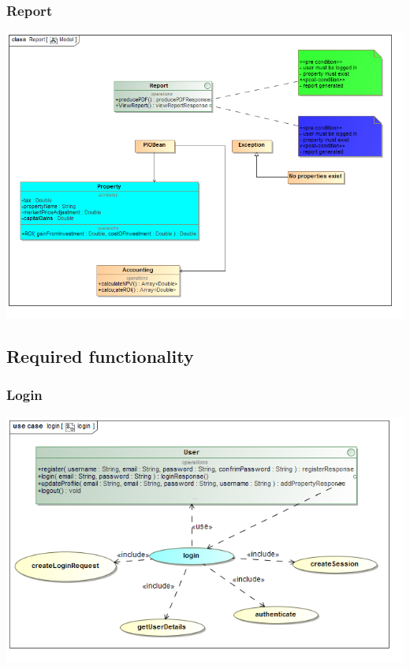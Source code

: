 \documentclass[a4paper,12pt]{article}
\begin{document}
\subsubsection{Report}
\includegraphics[width=1\textwidth]{./Images/newDiagrams/serviceContract/ReportServiceContract.png}

\subsection{Required functionality}
\subsubsection{Login}
\includegraphics[width=1\textwidth]{./Images/newDiagrams/requiredFunctionality/Diana/login.png}
\end{document}
